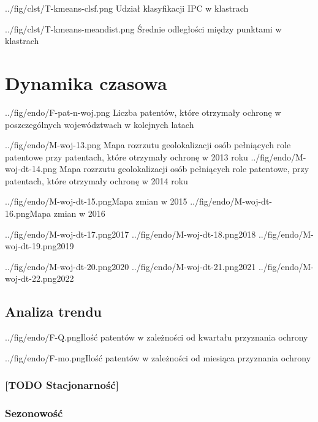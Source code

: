 \tblside
{../fig/clst/T-kmeans-clsf.png}
{Udział klasyfikacji \ac{IPC} w klastrach}

\tblside
{../fig/clst/T-kmeans-meandist.png}
{Średnie odległości między punktami w klastrach}




    \newpage\section{Dynamika czasowa}

  \figside
{../fig/endo/F-pat-n-woj.png}
{ Liczba patentów, które otrzymały ochronę w poszczególnych województwach 
  w kolejnych latach }

  \figsides
{../fig/endo/M-woj-13.png}
{ Mapa rozrzutu geolokalizacji osób pełniących role patentowe 
  przy patentach, które otrzymały ochronę w 2013 roku}
{../fig/endo/M-woj-dt-14.png}
{ Mapa rozrzutu geolokalizacji osób pełniących role patentowe, 
  przy patentach, które otrzymały ochronę w 2014 roku}

  \newpage\figsides
{../fig/endo/M-woj-dt-15.png}{Mapa zmian w 2015}
{../fig/endo/M-woj-dt-16.png}{Mapa zmian w 2016}

  \figsidesTri
{../fig/endo/M-woj-dt-17.png}{2017}
{../fig/endo/M-woj-dt-18.png}{2018}
{../fig/endo/M-woj-dt-19.png}{2019}

  \figsidesTri
{../fig/endo/M-woj-dt-20.png}{2020}
{../fig/endo/M-woj-dt-21.png}{2021}
{../fig/endo/M-woj-dt-22.png}{2022}






  \newpage\subsection
{Analiza trendu}



  \fig
{../fig/endo/F-Q.png}{Ilość patentów w zależności od kwartału przyznania ochrony}

  \fig
{../fig/endo/F-mo.png}{Ilość patentów w zależności od miesiąca przyznania ochrony}



  \subsubsection
{[TODO Stacjonarność]}




  \newpage\subsubsection
{Sezonowość}


